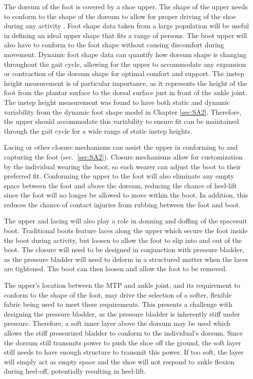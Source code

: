 \documentclass[defaultstyle,11pt]{comps}
\begin{document}
The dorsum of the foot is covered by a shoe upper.
The shape of the upper needs to conform to the shape of the dorsum to allow for proper driving of the shoe during any activity \citep{Feeney2019}.
Foot shape data taken from a large population will be useful in defining an ideal upper shape that fits a range of persons.
The boot upper will also have to conform to the foot shape without causing discomfort during movement.
Dynamic foot shape data can quantify how dorsum shape is changing throughout the gait cycle, allowing for the upper to accommodate any expansion or contraction of the dorsum shape for optimal comfort and support.
The instep height measurement is of particular importance, as it represents the height of the foot from the plantar surface to the dorsal surface just in front of the ankle joint.
The instep height measurement was found to have both static and dynamic variability from the dynamic foot shape model in Chapter \ref{sec:SA2}.
Therefore, the upper should accommodate this variability to ensure fit can be maintained through the gait cycle for a wide range of static instep heights.

Lacing or other closure mechanisms can assist the upper in conforming to and capturing the foot (sec.~\ref{sec:SA2}).
Closure mechanisms allow for customization by the individual wearing the boot, so each wearer can adjust the boot to their preferred fit.
Conforming the upper to the foot will also eliminate any empty space between the foot and above the dorsum, reducing the chance of heel-lift since the foot will no longer be allowed to move within the boot.
In addition, this reduces the chance of contact injuries from rubbing between the foot and boot.

The upper and lacing will also play a role in donning and doffing of the spacesuit boot.
Traditional boots feature laces along the upper which secure the foot inside the boot during activity, but loosen to allow the foot to slip into and out of the boot.
The closure will need to be designed in conjunction with pressure bladder, as the pressure bladder will need to deform in a structured matter when the laces are tightened.
The boot can then loosen and allow the foot to be removed.

The upper's location between the MTP and ankle joint, and its requirement to conform to the shape of the foot, may drive the selection of a softer, flexible fabric being used to meet these requirements.
This presents a challenge with designing the pressure bladder, as the pressure bladder is inherently stiff under pressure.
Therefore, a soft inner layer above the dorsum may be used which allows the stiff pressurized bladder to conform to the individual's dorsum.
Since the dorsum still transmits power to push the shoe off the ground, the soft layer still needs to have enough structure to transmit this power.
If too soft, the layer will simply act as empty space and the shoe will not respond to ankle flexion during heel-off, potentially resulting in heel-lift.
\end{document}

